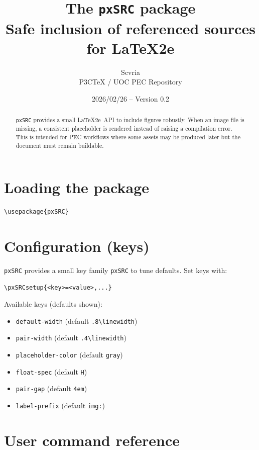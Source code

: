 \documentclass[11pt,a4paper]{article}
\title{The \texttt{pxSRC} package\\
  \large Safe inclusion of referenced sources for \LaTeX2e}
\author{Scvria\\P3CTeX / UOC PEC Repository}
\date{2026/02/26 -- Version 0.2}
\begin{document}
\maketitle

\begin{abstract}
  \texttt{pxSRC} provides a small \LaTeX2e\ API to include figures robustly.
  When an image file is missing, a consistent placeholder is rendered instead
  of raising a compilation error. This is intended for PEC workflows where
  some assets may be produced later but the document must remain buildable.
\end{abstract}

\tableofcontents

\section{Loading the package}

\begin{verbatim}
\usepackage{pxSRC}
\end{verbatim}

\section{Configuration (keys)}

\texttt{pxSRC} provides a small key family \texttt{pxSRC} to tune defaults.
Set keys with:

\begin{verbatim}
\pxSRCsetup{<key>=<value>,...}
\end{verbatim}

Available keys (defaults shown):
\begin{itemize}
  \item \texttt{default-width} (default \texttt{.8\textbackslash linewidth})
  \item \texttt{pair-width} (default \texttt{.4\textbackslash linewidth})
  \item \texttt{placeholder-color} (default \texttt{gray})
  \item \texttt{float-spec} (default \texttt{H})
  \item \texttt{pair-gap} (default \texttt{4em})
  \item \texttt{label-prefix} (default \texttt{img:})
\end{itemize}

\section{User command reference}
\end{document}
